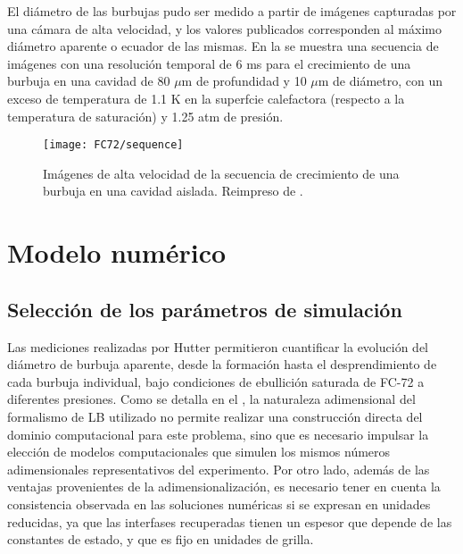 El di\'ametro de las burbujas pudo ser medido a partir de im\'agenes capturadas por una c\'amara de alta velocidad, y los valores publicados corresponden al m\'aximo di\'ametro aparente o ecuador de las mismas. En la  se muestra una secuencia de im\'agenes con una resoluci\'on temporal de 6 ms para el crecimiento de una burbuja en una cavidad de 80 $\mu$m de profundidad y 10 $\mu$m de di\'ametro, con un exceso de temperatura de 1.1 K en la superfcie calefactora (respecto a la temperatura de saturaci\'on) y 1.25 atm de presi\'on.

\begin{figure}[ht]
	\centering
	\texttt{[image: FC72/sequence]}
	\caption{Im\'agenes de alta velocidad de la secuencia de crecimiento de una burbuja en una cavidad aislada. Reimpreso de \cite{hutter_experimental_2010}.}
	\label{fig:sequence}
\end{figure}





\section{Modelo num\'erico}

\subsection{Selecci\'on de los par\'ametros de simulaci\'on}
\label{sec:param_sim_fc72}

Las mediciones realizadas por Hutter permitieron cuantificar la evoluci\'on del di\'ametro de burbuja aparente, desde la formaci\'on hasta el desprendimiento de cada burbuja individual, bajo condiciones de ebullici\'on saturada de FC-72 a diferentes presiones. Como se detalla en el , la naturaleza adimensional del formalismo de LB utilizado no permite realizar una construcci\'on directa del dominio computacional para este problema, sino que es necesario impulsar la elecci\'on de modelos computacionales que simulen los mismos n\'umeros adimensionales representativos del experimento. Por otro lado, adem\'as de las ventajas provenientes de la adimensionalizaci\'on, es necesario tener en cuenta la consistencia observada en las soluciones num\'ericas si se expresan en unidades reducidas, ya que las interfases recuperadas tienen un espesor que depende de las constantes de estado, y que es fijo en unidades de grilla.

